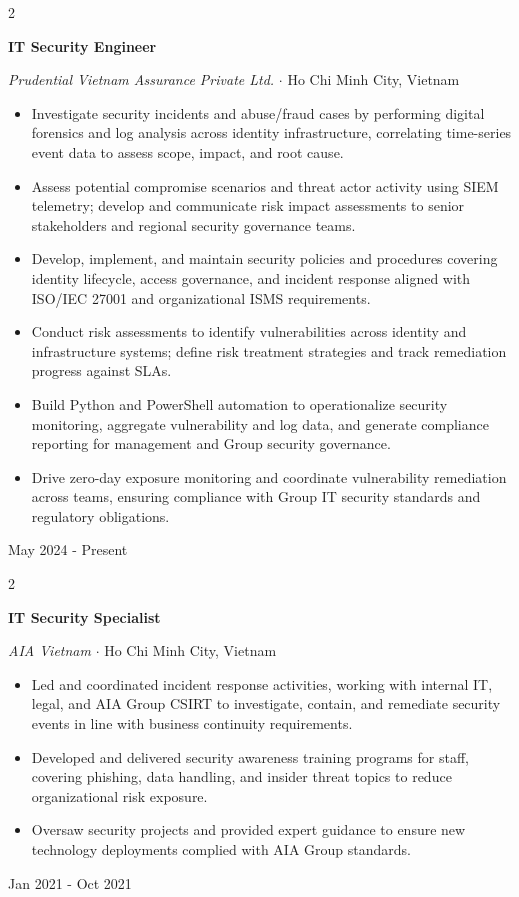 \documentclass[10pt, letterpaper]{article}
\newenvironment{highlights}{
    \begin{itemize}[
        topsep=0.08 cm,
        parsep=0.08 cm,
        partopsep=0pt,
        itemsep=0.05 cm,
        leftmargin=0 cm + 12pt
    ]
}{
    \end{itemize}
}
\newenvironment{twocolentry}[2][]{
    \onecolentry
    \def\secondColumn{#2}
    \setcolumnwidth{\fill, 4.8 cm}
    \begin{paracol}{2}
}{
    \switchcolumn \raggedleft \color{primaryColor}\small\secondColumn
    \end{paracol}
    \endonecolentry
}
\begin{document}
    \begin{twocolentry}{
        May 2024 - Present
    }
        \textbf{\color{primaryColor}IT Security Engineer}

        \textit{Prudential Vietnam Assurance Private Ltd.} $\cdot$ Ho Chi Minh City, Vietnam

        \begin{highlights}
            \item Investigate security incidents and abuse/fraud cases by performing digital forensics and log analysis across identity infrastructure, correlating time-series event data to assess scope, impact, and root cause.
            \item Assess potential compromise scenarios and threat actor activity using SIEM telemetry; develop and communicate risk impact assessments to senior stakeholders and regional security governance teams.
            \item Develop, implement, and maintain security policies and procedures covering identity lifecycle, access governance, and incident response aligned with ISO/IEC 27001 and organizational ISMS requirements.
            \item Conduct risk assessments to identify vulnerabilities across identity and infrastructure systems; define risk treatment strategies and track remediation progress against SLAs.
            \item Build Python and PowerShell automation to operationalize security monitoring, aggregate vulnerability and log data, and generate compliance reporting for management and Group security governance.
            \item Drive zero-day exposure monitoring and coordinate vulnerability remediation across teams, ensuring compliance with Group IT security standards and regulatory obligations.
        \end{highlights}
    \end{twocolentry}

    \vspace{0.15 cm}

    \begin{twocolentry}{
        Jan 2021 - Oct 2021
    }
        \textbf{\color{primaryColor}IT Security Specialist}

        \textit{AIA Vietnam} $\cdot$ Ho Chi Minh City, Vietnam

        \begin{highlights}
            \item Led and coordinated incident response activities, working with internal IT, legal, and AIA Group CSIRT to investigate, contain, and remediate security events in line with business continuity requirements.
            \item Developed and delivered security awareness training programs for staff, covering phishing, data handling, and insider threat topics to reduce organizational risk exposure.
            \item Oversaw security projects and provided expert guidance to ensure new technology deployments complied with AIA Group standards.
        \end{highlights}
    \end{twocolentry}
\end{document}
